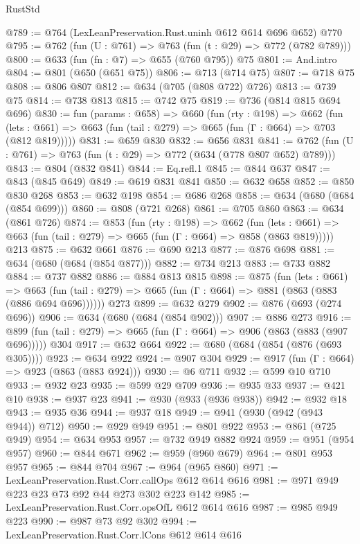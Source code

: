 \begin{lexlean}{RustStd}
\begin{coremodule}
@789 := @764 (LexLeanPreservation.Rust.uninh @612 @614 @696 @652) @770
@795 := @762 (fun (U : @761) => @763 (fun (t : @29) => @772 (@782 @789)))
@800 := @633 (fun (fn : @7) => @655 (@760 @795)) @75
@801 := And.intro
@804 := @801 (@650 (@651 @75))
@806 := @713 (@714 @75)
@807 := @718 @75
@808 := @806 @807
@812 := @634 (@705 (@808 @722) @726)
@813 := @739 @75
@814 := @738 @813
@815 := @742 @75
@819 := @736 (@814 @815 @694 @696)
@830 := fun (params : @658) =>
  @660
    (fun (rty : @198) =>
    @662
      (fun (lets : @661) => @663 (fun (tail : @279) => @665 (fun (Γ : @664) => @703 (@812 @819)))))
@831 := @659 @830
@832 := @656 @831
@841 := @762 (fun (U : @761) => @763 (fun (t : @29) => @772 (@634 (@778 @807 @652) @789)))
@843 := @804 (@832 @841)
@844 := Eq.refl.{1}
@845 := @844 @637
@847 := @843 (@845 @649)
@849 := @619 @831 @841
@850 := @632 @658
@852 := @850 @830 @268
@853 := @632 @198
@854 := @686 @268
@858 := @634 (@680 (@684 (@854 @699)))
@860 := @808 (@721 @268)
@861 := @705 @860
@863 := @634 (@861 @726)
@874 := @853
    (fun (rty : @198) =>
    @662
      (fun (lets : @661) => @663 (fun (tail : @279) => @665 (fun (Γ : @664) => @858 (@863 @819)))))
    @213
@875 := @632 @661
@876 := @690 @213
@877 := @876 @698
@881 := @634 (@680 (@684 (@854 @877)))
@882 := @734 @213
@883 := @733 @882
@884 := @737 @882
@886 := @884 @813 @815
@898 := @875
    (fun (lets : @661) =>
    @663 (fun (tail : @279) => @665 (fun (Γ : @664) => @881 (@863 (@883 (@886 @694 @696))))))
    @273
@899 := @632 @279
@902 := @876 (@693 (@274 @696))
@906 := @634 (@680 (@684 (@854 @902)))
@907 := @886 @273
@916 := @899 (fun (tail : @279) => @665 (fun (Γ : @664) => @906 (@863 (@883 (@907 @696))))) @304
@917 := @632 @664
@922 := @680 (@684 (@854 (@876 (@693 @305))))
@923 := @634 @922
@924 := @907 @304
@929 := @917 (fun (Γ : @664) => @923 (@863 (@883 @924)))
@930 := @6 @711
@932 := @599 @10 @710
@933 := @932 @23
@935 := @599 @29 @709
@936 := @935 @33
@937 := @421 @10
@938 := @937 @23
@941 := @930 (@933 (@936 @938))
@942 := @932 @18
@943 := @935 @36
@944 := @937 @18
@949 := @941 (@930 (@942 (@943 @944)) @712)
@950 := @929 @949
@951 := @801 @922
@953 := @861 (@725 @949)
@954 := @634 @953
@957 := @732 @949 @882 @924
@959 := @951 (@954 @957)
@960 := @844 @671
@962 := @959 (@960 @679)
@964 := @801 @953 @957
@965 := @844 @704
@967 := @964 (@965 @860)
@971 := LexLeanPreservation.Rust.Corr.callOps @612 @614 @616
@981 := @971 @949 @223 @23 @73 @92 @44 @273 @302 @223 @142
@985 := LexLeanPreservation.Rust.Corr.opsOfL @612 @614 @616
@987 := @985 @949 @223
@990 := @987 @73 @92 @302
@994 := LexLeanPreservation.Rust.Corr.lCons @612 @614 @616

\end{coremodule}
\end{lexlean}

